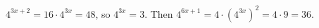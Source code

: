 $4^{3x+2}=16\cdot4^{3x}=48$, so $4^{3x}=3$. Then $4^{6x+1}=4\cdot\left(4^{3x}\right)^2=4\cdot9=\boxed{36}$.
